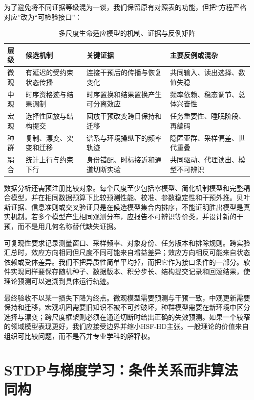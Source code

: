 为了避免将不同证据等级混为一谈，我们保留原有对照表的功能，但把“方程严格对应”改为“可检验接口”：
\begin{table}[htbp]
\centering
\footnotesize
\renewcommand{\arraystretch}{1.45}
\begin{tabularx}{\textwidth}{l|X|X|X}
\toprule
\textbf{层级} & \textbf{候选机制} & \textbf{关键证据} & \textbf{主要反例或混杂} \\
\midrule
微观 & 有延迟的受约束状态传播 & 连接干预后的传播与恢复变化 & 共同输入、读出选择、数值失稳 \\
中观 & 时序资格迹与结果调制 & 时序置换和结果置换产生可分离效应 & 频率依赖、稳态调节、总体兴奋性 \\
宏观 & 选择性回放与结构提交 & 回放干预改变跨日保持和迁移 & 任务重要性、睡眠阶段、再编码 \\
种群 & 复制、漂变、突变和迁移 & 谱系与环境操纵下的频率轨迹 & 隐匿亚群、采样偏差、世代重叠 \\
耦合 & 统计上行与约束下行 & 身份错配、时标接近和通道切断实验 & 共同驱动、代理读出、模型不可辨识 \\
\bottomrule
\end{tabularx}
\caption{多尺度生命适应模型的机制、证据与反例矩阵}
\label{tab:biology_hsfhd_mapping}
\end{table}

数据分析还需预注册比较对象。每个尺度至少包括零模型、简化机制模型和完整耦合模型，并在相同数据预算下比较预测性能、校准、参数稳定性和干预外推。贝叶斯证据、信息准则或交叉验证只是在候选模型集合内排序，不能证明胜出模型是真实机制。若多个模型产生相同观测分布，应报告不可辨识等价类，并设计新的干预，而不是用几何名称替代缺失证据。

可复现性要求记录测量窗口、采样频率、对象身份、任务版本和排除规则。跨实验汇总时，效应方向相同但尺度不同可能来自增益差异；效应方向相反可能来自状态依赖或受体差异。我们不把异质性简单平均掉，而把它作为接口条件的一部分。软件实现同样要保存随机种子、数据版本、积分步长、结构提交记录和回滚结果，使理论预测可以追溯到具体运行轨迹。

最终验收不以某一损失下降为终点。微观模型需要预测与干预一致，中观更新需要保持和迁移，宏观巩固需要旧知识不被不可控破坏，种群模型需要在新环境中区分选择与漂变；跨尺度框架则必须在通道切断时给出正确的失效预测。如果一个较窄的领域模型表现更好，我们应接受边界并缩小HSF-HD主张。一般理论的价值来自组织可比较问题，而不是吞并专业学科的解释权。

\section{STDP与梯度学习：条件关系而非算法同构}
\label{sec:stdp_vs_gradient_descent_isomorphism}

